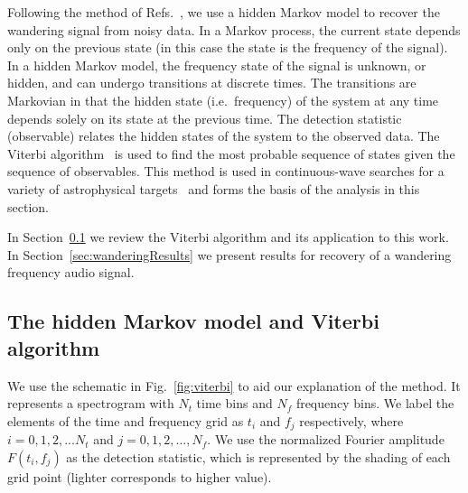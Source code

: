 \documentclass[paper-main.tex]{subfiles}
\begin{document}
Following the method of Refs.~\cite{SuvorovaEtAl:2016,SuvorovaEtAl:2017}, we use a hidden Markov model to recover the wandering signal from noisy data. 
In a Markov process, the current state depends only on the previous state (in this case the state is the frequency of the signal). 
In a hidden Markov model, the frequency state of the signal is unknown, or hidden, and can undergo transitions at discrete times. 
The transitions are Markovian in that the hidden state (i.e.\ frequency) of the system at any time depends solely on its state at the previous time. The detection statistic (observable) relates the hidden states of the system to the observed data.
The Viterbi algorithm~\cite{Viterbi:1967} is used to find the most probable sequence of states given the sequence of observables.
This method is used in continuous-wave searches for a variety of astrophysical targets~\cite{ScoX1O2Viterbi:2019, ScoX1ViterbiO1:2017, MillhouseStrangMelatos:2020, JonesSun:2020, MiddletonEtAlO2LMXBs:2020, PostMergerRemnantSearch:2019, SunEtAlSNR:2018, viterbi_application} and forms the basis of the analysis in this section. 
 

In Section~\ref{sec:viterbi} we review the Viterbi algorithm and its application to this work. 
In Section~\ref{sec:wanderingResults} we present results for recovery of a wandering frequency audio signal. 






\subsection{The hidden Markov model and Viterbi algorithm}
\label{sec:viterbi}


We use the schematic in Fig.~\ref{fig:viterbi} to aid our explanation of the method. 
It represents a spectrogram with $N_t$ time bins and $N_f$ frequency bins. 
We label the elements of the time and frequency  grid as $t_i$ and $f_j$ respectively, where $i=0,1,2,...N_t$ and $j=0,1,2,...,N_f$. 
We use the normalized Fourier amplitude $F(t_i,f_j)$ as the detection statistic, which is represented by the shading of each grid point (lighter corresponds to higher value). 
\end{document}
